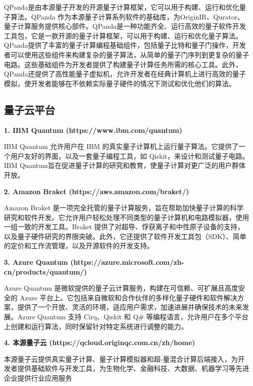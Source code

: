 QPanda是由本源量子开发的开源量子计算框架，它可以用于构建、运行和优化量子算法。QPanda 作为本源量子计算系列软件的基础库，为OriginIR、Qurator、量子计算服务提供核心部件。QPanda是一种功能齐全、运行高效的量子软件开发工具包，它是一款开源的量子计算框架，可以用于构建、运行和优化量子算法。QPanda提供了丰富的量子计算编程基础组件，包括量子比特和量子门操作，开发者可以使用这些组件来构建复杂的量子算法，从简单的量子门序列到更复杂的量子电路。这些基础组件为开发者提供了构建量子计算任务所需的核心工具。此外，QPanda还提供了高性能量子虚拟机，允许开发者在经典计算机上进行高效的量子模拟，使开发者能够在不依赖实际量子硬件的情况下测试和优化他们的算法。

\subsection{量子云平台}
\textbf{1. IBM Quantum  (https://www.ibm.com/quantum)}

IBM Quantum 允许用户在 IBM 的真实量子计算机上运行量子算法。它提供了一个用户友好的界面，以及一套量子编程工具，如 Qiskit，来设计和测试量子电路。IBM Quantum旨在促进量子计算的研究和教育，使量子计算对更广泛的用户群体开放。

\textbf{2. Amazon Braket (https://aws.amazon.com/braket/)}

Amazon Braket 是一项完全托管的量子计算服务，旨在帮助加快量子计算的科学研究和软件开发。它允许用户轻松处理不同类型的量子计算机和电路模拟器，使用一组一致的开发工具。Braket 提供了对超导、俘获离子和中性原子设备的支持，以及量子硬件研究的界限突破。此外，它还提供了软件开发工具包（SDK）、简单的定价和工作流管理，以及开源软件的开发支持。

\textbf{3. Azure Quantum (https://azure.microsoft.com/zh-cn/products/quantum/)}

Azure Quantum 是微软提供的量子云计算服务，构建在可信赖、可扩展且高度安全的 Azure 平台上。它包括来自微软和合作伙伴的多样化量子硬件和软件解决方案，提供了一个开放、灵活的环境，适应用户需求，加速进展并确保技术的未来发展。Azure Quantum 支持 Cirq、Qiskit 和 Q\# 等编程语言，允许用户在多个平台上创建和运行算法，同时保留针对特定系统进行调整的能力。

\textbf{4. 本源量子云 (https://qcloud.originqc.com.cn/zh/home)}

本源量子云提供真实量子计算、量子计算模拟器和超-量混合计算后端接入，为开发者提供基础软件与开发工具，为生物化学、金融科技、大数据、机器学习等先进企业提供行业应用服务